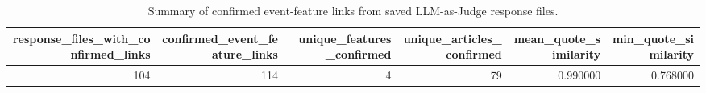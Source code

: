 \begin{table}
\caption{Summary of confirmed event-feature links from saved LLM-as-Judge response files.}
\label{tab:llm_judge_confirmed_summary}
\begin{tabular}{rrrrrr}
\toprule
response_files_with_confirmed_links & confirmed_event_feature_links & unique_features_confirmed & unique_articles_confirmed & mean_quote_similarity & min_quote_similarity \\
\midrule
104 & 114 & 4 & 79 & 0.990000 & 0.768000 \\
\bottomrule
\end{tabular}
\end{table}
